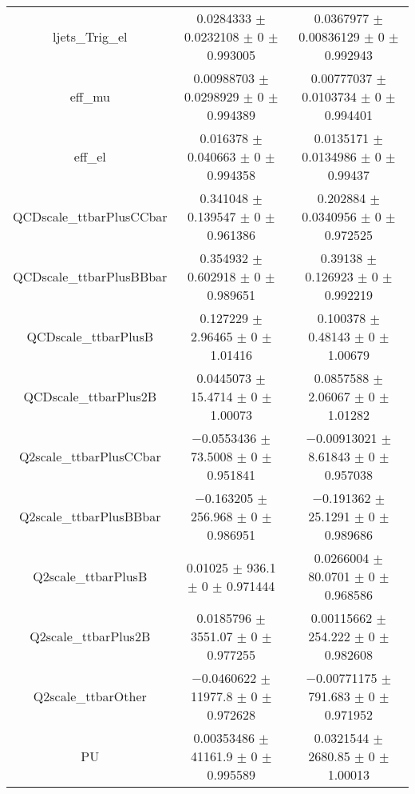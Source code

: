 \begin{table}
\begin{tabular}{ccc}
ljets\_Trig\_el & \num{0.0284333} $\pm$ \num{0.0232108} $\pm$ \num{0} $\pm$ \num{0.993005} & \num{0.0367977} $\pm$ \num{0.00836129} $\pm$ \num{0} $\pm$ \num{0.992943}\\
eff\_mu & \num{0.00988703} $\pm$ \num{0.0298929} $\pm$ \num{0} $\pm$ \num{0.994389} & \num{0.00777037} $\pm$ \num{0.0103734} $\pm$ \num{0} $\pm$ \num{0.994401}\\
eff\_el & \num{0.016378} $\pm$ \num{0.040663} $\pm$ \num{0} $\pm$ \num{0.994358} & \num{0.0135171} $\pm$ \num{0.0134986} $\pm$ \num{0} $\pm$ \num{0.99437}\\
QCDscale\_ttbarPlusCCbar & \num{0.341048} $\pm$ \num{0.139547} $\pm$ \num{0} $\pm$ \num{0.961386} & \num{0.202884} $\pm$ \num{0.0340956} $\pm$ \num{0} $\pm$ \num{0.972525}\\
QCDscale\_ttbarPlusBBbar & \num{0.354932} $\pm$ \num{0.602918} $\pm$ \num{0} $\pm$ \num{0.989651} & \num{0.39138} $\pm$ \num{0.126923} $\pm$ \num{0} $\pm$ \num{0.992219}\\
QCDscale\_ttbarPlusB & \num{0.127229} $\pm$ \num{2.96465} $\pm$ \num{0} $\pm$ \num{1.01416} & \num{0.100378} $\pm$ \num{0.48143} $\pm$ \num{0} $\pm$ \num{1.00679}\\
QCDscale\_ttbarPlus2B & \num{0.0445073} $\pm$ \num{15.4714} $\pm$ \num{0} $\pm$ \num{1.00073} & \num{0.0857588} $\pm$ \num{2.06067} $\pm$ \num{0} $\pm$ \num{1.01282}\\
Q2scale\_ttbarPlusCCbar & \num{-0.0553436} $\pm$ \num{73.5008} $\pm$ \num{0} $\pm$ \num{0.951841} & \num{-0.00913021} $\pm$ \num{8.61843} $\pm$ \num{0} $\pm$ \num{0.957038}\\
Q2scale\_ttbarPlusBBbar & \num{-0.163205} $\pm$ \num{256.968} $\pm$ \num{0} $\pm$ \num{0.986951} & \num{-0.191362} $\pm$ \num{25.1291} $\pm$ \num{0} $\pm$ \num{0.989686}\\
Q2scale\_ttbarPlusB & \num{0.01025} $\pm$ \num{936.1} $\pm$ \num{0} $\pm$ \num{0.971444} & \num{0.0266004} $\pm$ \num{80.0701} $\pm$ \num{0} $\pm$ \num{0.968586}\\
Q2scale\_ttbarPlus2B & \num{0.0185796} $\pm$ \num{3551.07} $\pm$ \num{0} $\pm$ \num{0.977255} & \num{0.00115662} $\pm$ \num{254.222} $\pm$ \num{0} $\pm$ \num{0.982608}\\
Q2scale\_ttbarOther & \num{-0.0460622} $\pm$ \num{11977.8} $\pm$ \num{0} $\pm$ \num{0.972628} & \num{-0.00771175} $\pm$ \num{791.683} $\pm$ \num{0} $\pm$ \num{0.971952}\\
PU & \num{0.00353486} $\pm$ \num{41161.9} $\pm$ \num{0} $\pm$ \num{0.995589} & \num{0.0321544} $\pm$ \num{2680.85} $\pm$ \num{0} $\pm$ \num{1.00013}\\

\end{tabular}
\end{table}
